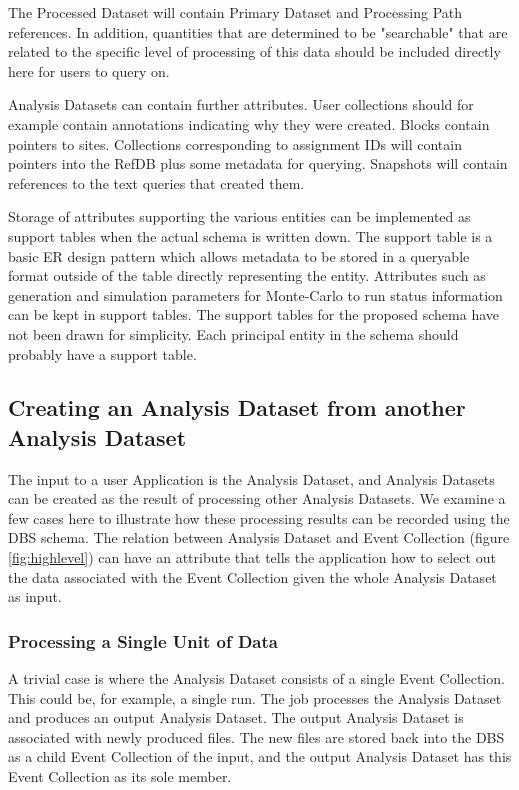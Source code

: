 \documentclass{cmspaper}
\begin{document}
The Processed Dataset will contain Primary Dataset and Processing Path 
references.
In addition, quantities that are determined to be "searchable" that are related to the 
specific level of processing of this data should be included directly here for 
users to query on.  

Analysis Datasets can contain further attributes.  User collections should for 
example contain annotations indicating why they were created.  Blocks contain 
pointers to sites.  Collections corresponding to assignment IDs will contain pointers 
into the RefDB plus some metadata for querying. Snapshots will contain references to the
text queries that created them.

Storage of attributes supporting the various 
entities  can be implemented as support tables when the actual schema is written down.  
The support table 
is a basic ER design pattern which allows metadata to be stored in a queryable format 
outside of the table directly representing the entity.  Attributes such as generation and 
simulation parameters for Monte-Carlo to run status information can be kept in support 
tables.   The support tables for the proposed schema have not been drawn for simplicity.  
Each principal entity in the schema should probably have a support table.

\subsection{Creating an Analysis Dataset from another Analysis Dataset}
\label{sec:createEvColl}

The input to a user Application is the Analysis Dataset, and Analysis Datasets can be 
created as the result of processing other Analysis Datasets.  We examine a few cases 
here to illustrate how these processing results can be recorded using the DBS schema.
The relation between Analysis Dataset and Event Collection 
(figure \ref{fig:highlevel}) can have an attribute that tells the application how to select 
out the data associated with the Event Collection given the whole Analysis Dataset as
input.  

\subsubsection{Processing a Single Unit of Data}

A trivial case is where the Analysis Dataset consists of a single Event Collection. 
This could be, for example, a single run.  The job processes the Analysis Dataset 
and produces an output Analysis Dataset.  The output Analysis Dataset is associated 
with newly produced files.  The new files are stored back into the DBS as a child 
Event Collection of the input,  and the output Analysis Dataset has this Event Collection 
as its sole member. 
\end{document}
